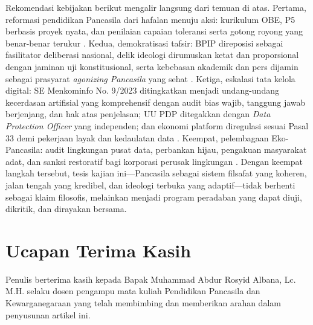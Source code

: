 \documentclass[journal]{IEEEtran}
\begin{document}
Rekomendasi kebijakan berikut mengalir langsung dari temuan di atas. Pertama, reformasi pendidikan Pancasila dari hafalan menuju aksi: kurikulum OBE, P5 berbasis proyek nyata, dan penilaian capaian toleransi serta gotong royong yang benar-benar terukur \cite{effend2024,bpip2022}. Kedua, demokratisasi tafsir: BPIP direposisi sebagai fasilitator deliberasi nasional, delik ideologi dirumuskan ketat dan proporsional dengan jaminan uji konstitusional, serta kebebasan akademik dan pers dijamin sebagai prasyarat \textit{agonizing Pancasila} yang sehat \cite{kim2024,suntana2023}. Ketiga, eskalasi tata kelola digital: SE Menkominfo No. 9/2023 ditingkatkan menjadi undang-undang kecerdasan artifisial yang komprehensif dengan audit bias wajib, tanggung jawab berjenjang, dan hak atas penjelasan; UU PDP ditegakkan dengan \textit{Data Protection Officer} yang independen; dan ekonomi platform diregulasi sesuai Pasal 33 demi pekerjaan layak dan kedaulatan data \cite{kominfo2023,uupdp2022,uud1945}. Keempat, pelembagaan Eko-Pancasila: audit lingkungan pusat data, perbankan hijau, pengakuan masyarakat adat, dan sanksi restoratif bagi korporasi perusak lingkungan \cite{yusa2022}. Dengan keempat langkah tersebut, tesis kajian ini---Pancasila sebagai sistem filsafat yang koheren, jalan tengah yang kredibel, dan ideologi terbuka yang adaptif---tidak berhenti sebagai klaim filosofis, melainkan menjadi program peradaban yang dapat diuji, dikritik, dan dirayakan bersama.

\section*{Ucapan Terima Kasih}

Penulis berterima kasih kepada Bapak Muhammad Abdur Rosyid Albana, Lc. M.H. selaku dosen pengampu mata kuliah Pendidikan Pancasila dan Kewarganegaraan yang telah membimbing dan memberikan arahan dalam penyusunan artikel ini.



\end{document}
